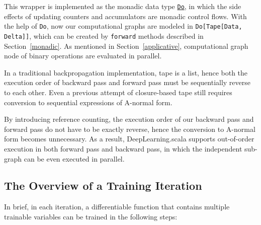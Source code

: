 This wrapper is implemented as the monadic data type \href{https://javadoc.io/page/com.thoughtworks.raii/asynchronous_2.11/latest/com/thoughtworks/raii/asynchronous%24%24Do.html}{\lstinline{Do}}, in which the side effects of updating counters and accumulators are monadic control flows. With the help of \lstinline{Do}, now our \glspl{computational graph} are modeled in \lstinline{Do[Tape[Data, Delta]]}, which can be created by \lstinline{forward} methods described in Section~\ref{monadic}. As mentioned in Section~\ref{applicative}, \gls{computational graph} node of binary operations are evaluated in parallel.

In a traditional backpropagation implementation, tape is a list, hence both the execution order of backward pass and forward pass must be sequentially reverse to each other. Even a previous attempt of closure-based tape\cite{pearlmutter2008reverse} still requires conversion to sequential expressions of A-normal form\cite{sabry1993reasoning}. 

By introducing reference counting, the execution order of our backward pass and forward pass do not have to be exactly reverse, hence the conversion to A-normal form becomes unnecessary. As a result, DeepLearning.scala supports out-of-order execution in both forward pass and backward pass, in which the independent sub-graph can be even executed in parallel.

\subsection{The Overview of a Training Iteration}
\label{training iteration}

In brief, in each iteration, a \gls{differentiable function} that contains multiple \glspl{trainable variable} can be trained in the following steps:

